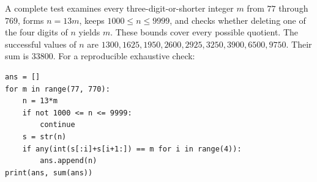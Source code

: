 A complete test examines every three-digit-or-shorter integer $m$ from $77$ through $769$, forms $n=13m$, keeps $1000\le n\le9999$, and checks whether deleting one of the four digits of $n$ yields $m$. These bounds cover every possible quotient. The successful values of $n$ are $1300,1625,1950,2600,2925,3250,3900,6500,9750$. Their sum is $\boxed{33800}$. For a reproducible exhaustive check:\begin{verbatim}
ans = []
for m in range(77, 770):
    n = 13*m
    if not 1000 <= n <= 9999:
        continue
    s = str(n)
    if any(int(s[:i]+s[i+1:]) == m for i in range(4)):
        ans.append(n)
print(ans, sum(ans))
\end{verbatim}
